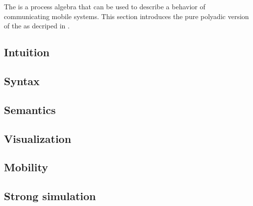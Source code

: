 The \findex[\picalc{}|(]{\picalc{}} is a process algebra that can be used to describe a behavior of communicating mobile systems. This section introduces the pure polyadic version of the \picalc{} as decriped in \cite{milner}. 


\subsection{Intuition}
\label{sec_pi_intuition}


\subsection{Syntax}
\label{sec_pi_syntax}


\subsection{Semantics}
\label{sec_pi_sem}


\subsection{Visualization}
\label{sec_pi_visualization}


\subsection{Mobility}
\label{sec_pi_mobility}


\subsection{Strong simulation}
\label{sec_pi_simulation}


\newpage %
